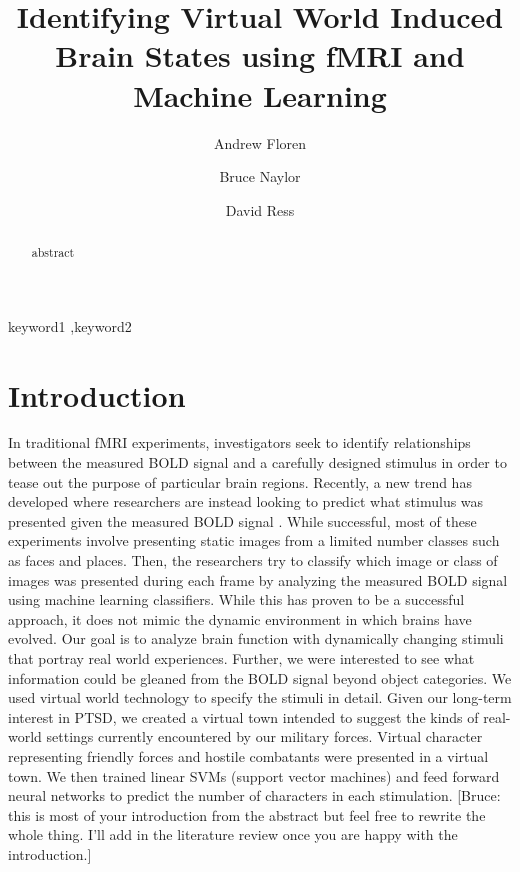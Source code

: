 \documentclass[preprint,authoryear,12pt]{elsarticle}
\begin{document}
\begin{frontmatter}

\title{Identifying Virtual World Induced Brain States using fMRI and Machine Learning}

\author[UT]{Andrew Floren}

\author[UT]{Bruce Naylor}

\author[UT]{David Ress}

\address[UT]{The University of Texas at Austin, Austin, TX 78712 USA}


\begin{abstract}
abstract
\end{abstract}

\begin{keyword}
keyword1 \sep keyword2
\end{keyword}

\end{frontmatter}

\section{Introduction}
In traditional fMRI experiments, investigators seek to identify relationships between the measured BOLD signal and a carefully designed stimulus in order to tease out the purpose of particular brain regions.
Recently, a new trend has developed where researchers are instead looking to predict what stimulus was presented given the measured BOLD signal \citep{Haxby2001,Mitchell2003,Haynes2006}.
While successful, most of these experiments involve presenting static images from a limited number classes such as faces and places.
Then, the researchers try to classify which image or class of images was presented during each frame by analyzing the measured BOLD signal using machine learning classifiers.
While this has proven to be a successful approach, it does not mimic the dynamic environment in which brains have evolved.
Our goal is to analyze brain function with dynamically changing stimuli that portray real world experiences.
Further, we were interested to see what information could be gleaned from the BOLD signal beyond object categories.
We used virtual world technology to specify the stimuli in detail.
Given our long-term interest in PTSD, we created a virtual town intended to suggest the kinds of real-world settings currently encountered by our military forces.
Virtual character representing friendly forces and hostile combatants were presented in a virtual town.
We then trained linear SVMs (support vector machines) and feed forward neural networks to predict the number of characters in each stimulation.
[Bruce: this is most of your introduction from the abstract but feel free to rewrite the whole thing. I'll add in the literature review once you are happy with the introduction.]
\end{document}
